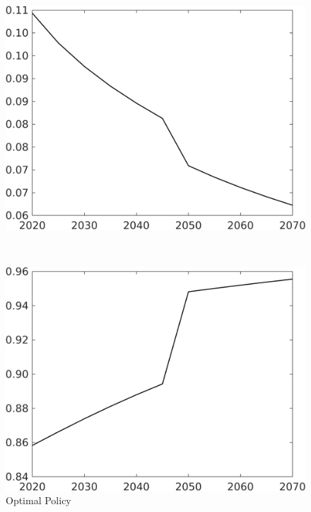 \begin{figure}[h!!]
	\centering
	\caption{Optimal Policy }\label{fig:optPol}
	\begin{minipage}[]{0.4\textwidth}
		\includegraphics[width=1\textwidth]{../../codding_model/own_basedOnFried/optimalPol_190722_tidiedUp/figures/all_Aout22/Single_OPT_T_NoTaus_taul_regime3_spillover0_noskill0_sep1_xgrowth0_extern0_etaa0.79.png}
	\end{minipage}
	\begin{minipage}[]{0.1\textwidth}
		\
	\end{minipage}
	\begin{minipage}[]{0.4\textwidth}
		\includegraphics[width=1\textwidth]{../../codding_model/own_basedOnFried/optimalPol_190722_tidiedUp/figures/all_Aout22/Single_OPT_T_NoTaus_tauf_regime3_spillover0_noskill0_sep1_xgrowth0_extern0_etaa0.79.png}
	\end{minipage}
\end{figure} 


